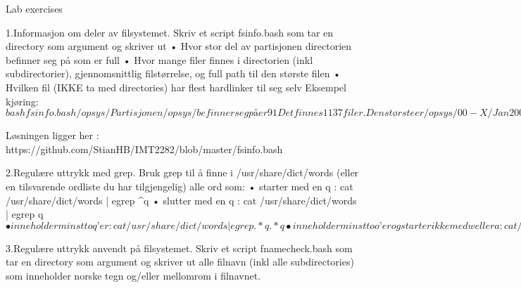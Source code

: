 Lab exercises

1.Informasjon om deler av filsystemet.
Skriv et script fsinfo.bash som tar en directory som argument og skriver ut 
• Hvor stor del av partisjonen directorien befinner seg på som er full
• Hvor mange filer finnes i directorien (inkl subdirectorier), gjennomsnittlig filstørrelse, og full path til den største filen
• Hvilken fil (IKKE ta med directories) har flest hardlinker til seg selv 
Eksempel kjøring:
$ bash fsinfo.bash /opsys/
Partisjonen /opsys/ befinner seg på er 91%
Det finnes 1137 filer.
Den største er /opsys/00-X/Jan2007.doc som er 14110208 (14M) stor.
Gjennomsnittlig filstørrelse er ca 186208 bytes.
Filen /opsys/06-filesystems/lab/c har flest hardlinks, den har 3.
$

Løsningen ligger her : https://github.com/StianHB/IMT2282/blob/master/fsinfo.bash

2.Regulære uttrykk med grep.
Bruk grep til å finne i /usr/share/dict/words (eller en tilsvarende ordliste du har tilgjengelig) alle ord som:
• starter med en q : cat /usr/share/dict/words | egrep ^q
• slutter med en q : cat /usr/share/dict/words | egrep q$
• inneholder minst to q’er : cat /usr/share/dict/words | egrep .*q.*q
• inneholder minst to o’er og starter ikke med w eller a : cat /usr/share/dict/words |  
• er 7 eller 8 tegn lange : cat /usr/share/dict/words | egrep ^.{7,8}$



3.Regulære uttrykk anvendt på filsystemet.
Skriv et script fnamecheck.bash som tar en directory som argument og skriver ut alle filnavn (inkl alle subdirectories) som inneholder norske tegn og/eller mellomrom i filnavnet.

